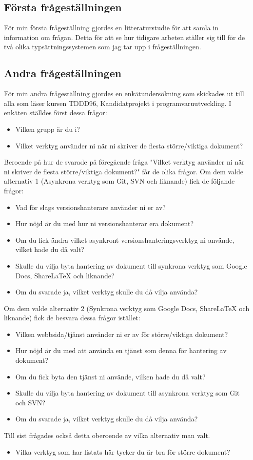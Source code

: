 \subsection{Första frågeställningen}
För min första frågeställning gjordes en litteraturstudie för att samla in information om frågan. Detta för att se hur tidigare arbeten ställer sig till för de två olika typsättningssystemen som jag tar upp i frågeställningen.

\subsection{Andra frågeställningen}
För min andra frågeställning gjordes en enkätundersökning som skickades ut till alla som läser kursen TDDD96, Kandidatprojekt i programvaruutveckling. I enkäten ställdes först dessa frågor:
\begin{itemize}
	\item Vilken grupp är du i?
	\item Vilket verktyg använder ni när ni skriver de flesta större/viktiga dokument?
\end{itemize}
Beroende på hur de svarade på föregående fråga "Vilket verktyg använder ni när ni skriver de flesta större/viktiga dokument?" får de olika frågor. Om dem valde alternativ 1 (Asynkrona verktyg som Git, SVN och liknande) fick de följande frågor:
\begin{itemize}
	\item Vad för slags versionshanterare använder ni er av?
	\item Hur nöjd är du med hur ni versionshanterar era dokument?
	\item Om du fick ändra vilket asynkront versionshanteringsverktyg ni använde, vilket hade du då valt?
	\item Skulle du vilja byta hantering av dokument till synkrona verktyg som Google Docs, ShareLaTeX och liknande?
	\item Om du svarade ja, vilket verktyg skulle du då vilja använda?
\end{itemize}
Om dem valde alternativ 2 (Synkrona verktyg som Google Docs, ShareLaTeX och liknande) fick de besvara dessa frågor istället:
\begin{itemize}
	\item Vilken webbsida/tjänst använder ni er av för större/viktiga dokument?
	\item Hur nöjd är du med att använda en tjänst som denna för hantering av dokument?
	\item Om du fick byta den tjänst ni använde, vilken hade du då valt?
	\item Skulle du vilja byta hantering av dokument till asynkrona verktyg som Git och SVN?
	\item Om du svarade ja, vilket verktyg skulle du då vilja använda?
\end{itemize}
Till sist frågades också detta oberoende av vilka alternativ man valt.
\begin{itemize}
	\item Vilka verktyg som har listats här tycker du är bra för större dokument?
\end{itemize}


